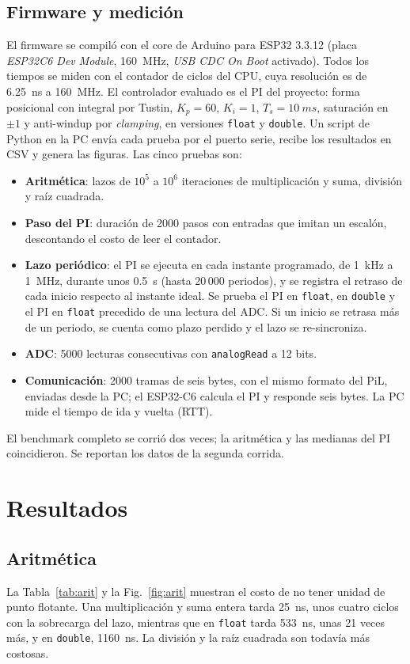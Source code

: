 \documentclass[conference]{IEEEtran}
\begin{document}
\subsection{Firmware y medición}
El firmware se compiló con el core de Arduino para ESP32 3.3.12 (placa \textit{ESP32C6 Dev Module}, \SI{160}{MHz}, \textit{USB CDC On Boot} activado). Todos los tiempos se miden con el contador de ciclos del CPU, cuya resolución es de \SI{6.25}{ns} a \SI{160}{MHz}. El controlador evaluado es el PI del proyecto: forma posicional con integral por Tustin, $K_p=60$, $K_i=1$, $T_s=\SI{10}{ms}$, saturación en $\pm1$ y anti-windup por \textit{clamping}, en versiones \texttt{float} y \texttt{double}. Un script de Python en la PC envía cada prueba por el puerto serie, recibe los resultados en CSV y genera las figuras. Las cinco pruebas son:
\begin{itemize}
\item \textbf{Aritmética}: lazos de $10^5$ a $10^6$ iteraciones de multiplicación y suma, división y raíz cuadrada.
\item \textbf{Paso del PI}: duración de 2000 pasos con entradas que imitan un escalón, descontando el costo de leer el contador.
\item \textbf{Lazo periódico}: el PI se ejecuta en cada instante programado, de \SI{1}{kHz} a \SI{1}{MHz}, durante unos \SI{0.5}{s} (hasta 20\,000 periodos), y se registra el retraso de cada inicio respecto al instante ideal. Se prueba el PI en \texttt{float}, en \texttt{double} y el PI en \texttt{float} precedido de una lectura del ADC. Si un inicio se retrasa más de un periodo, se cuenta como plazo perdido y el lazo se re-sincroniza.
\item \textbf{ADC}: 5000 lecturas consecutivas con \texttt{analogRead} a 12 bits.
\item \textbf{Comunicación}: 2000 tramas de seis bytes, con el mismo formato del PiL, enviadas desde la PC; el ESP32-C6 calcula el PI y responde seis bytes. La PC mide el tiempo de ida y vuelta (RTT).
\end{itemize}
El benchmark completo se corrió dos veces; la aritmética y las medianas del PI coincidieron. Se reportan los datos de la segunda corrida.

\section{Resultados}

\subsection{Aritmética}
La Tabla~\ref{tab:arit} y la Fig.~\ref{fig:arit} muestran el costo de no tener unidad de punto flotante. Una multiplicación y suma entera tarda \SI{25}{ns}, unos cuatro ciclos con la sobrecarga del lazo, mientras que en \texttt{float} tarda \SI{533}{ns}, unas 21 veces más, y en \texttt{double}, \SI{1160}{ns}. La división y la raíz cuadrada son todavía más costosas.
\end{document}
